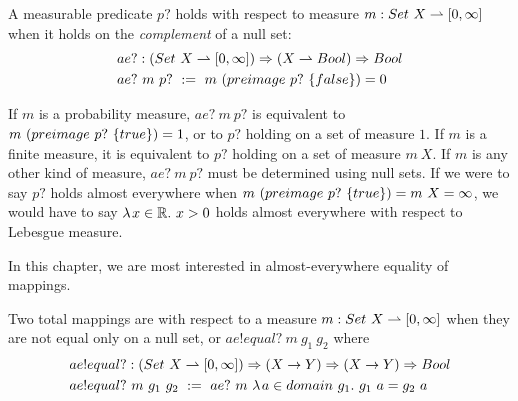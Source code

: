 \begin{definition}
\label{def:almost-everywhere}
A measurable predicate $p?$ holds  with respect to measure $m : Set~X \rightharpoonup [0,\infty]$ when it holds on the \emph{complement} of a null set:
\begin{equation}
\begin{aligned}
	&ae? : (Set~X \rightharpoonup [0,\infty]) \Rightarrow (X \rightharpoonup Bool) \Rightarrow Bool \\
	&ae?~m~p?\ :=\ m~(preimage~p?~\{{false}\}) = 0
\end{aligned}
\label{eqn:ae-def}
\end{equation}
\end{definition}

If $m$ is a probability measure, $ae?~m~p?$ is equivalent to $m~(preimage~p?~\{{true}\}) = 1$, or to $p?$ holding on a set of measure $1$.
If $m$ is a finite measure, it is equivalent to $p?$ holding on a set of measure $m~X$.
If $m$ is any other kind of measure, $ae?~m~p?$ must be determined using null sets.
If we were to say $p?$ holds almost everywhere when $m~(preimage~p?~\{{true}\}) = m~X = \infty$, we would have to say $\lambda\mspace{2mu}{x \in \mathbb{R}}\ldotp\, x > 0$ holds almost everywhere with respect to Lebesgue measure.


In this chapter, we are most interested in almost-everywhere equality of mappings.

\begin{definition}
\label{def:almost-everywhere-equality}
Two total mappings are  with respect to a measure $m : Set~X \rightharpoonup [0,\infty]$ when they are not equal only on a null set, or $ae!equal?~m~g_1~g_2$ where
\begin{equation}
\begin{aligned}
	&ae!equal? : (Set~X \rightharpoonup [0,\infty]) \Rightarrow (X \to Y) \Rightarrow (X \to Y) \Rightarrow Bool \\
	&ae!equal?~m~g_1~g_2\ :=\ ae?~m~\lambda\mspace{2mu}{a \in domain~g_1}\ldotp\, g_1~a = g_2~a
\end{aligned}
\end{equation}
\end{definition}

